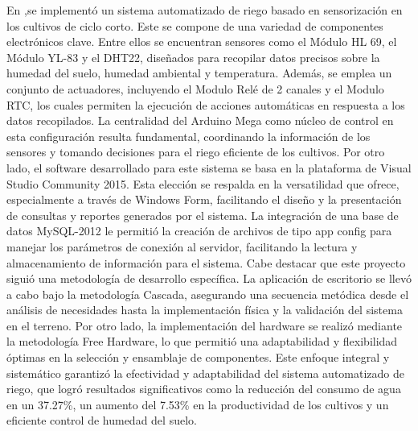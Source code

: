 \bigbreak
En \cite{alcivar_dominguez_sistema_2018},se implementó un sistema automatizado de
riego basado en sensorización en los cultivos de ciclo corto. Este se compone de una variedad de componentes electrónicos clave. Entre ellos se encuentran sensores como el Módulo HL 69, el Módulo YL-83 y el DHT22, diseñados para recopilar datos precisos sobre la humedad del suelo, humedad ambiental y temperatura. Además, se emplea un conjunto de actuadores, incluyendo el Modulo Relé de 2 canales y el Modulo RTC, los cuales permiten la ejecución de acciones automáticas en respuesta a los datos recopilados. La centralidad del Arduino Mega como núcleo de control en esta configuración resulta fundamental, coordinando la información de los sensores y tomando decisiones para el riego eficiente de los cultivos. Por otro lado, el software desarrollado para este sistema se basa en la plataforma de Visual Studio Community 2015. Esta elección se respalda en la versatilidad que ofrece, especialmente a través de Windows Form, facilitando el diseño y la presentación de consultas y reportes generados por el sistema. La integración de una base de datos MySQL-2012 le permitió la creación de archivos de tipo app config para manejar los parámetros de conexión al servidor, facilitando la lectura y almacenamiento de información para el sistema. Cabe destacar que este proyecto siguió una metodología de desarrollo específica. La aplicación de escritorio se llevó a cabo bajo la metodología Cascada, asegurando una secuencia metódica desde el análisis de necesidades hasta la implementación física y la validación del sistema en el terreno. Por otro lado, la implementación del hardware se realizó mediante la metodología Free Hardware, lo que permitió una adaptabilidad y flexibilidad óptimas en la selección y ensamblaje de componentes. Este enfoque integral y sistemático garantizó la efectividad y adaptabilidad del sistema automatizado de riego, que logró resultados significativos como la reducción del consumo de agua en un 37.27\%, un aumento del 7.53\% en la productividad de los cultivos y un eficiente control de humedad del suelo.

